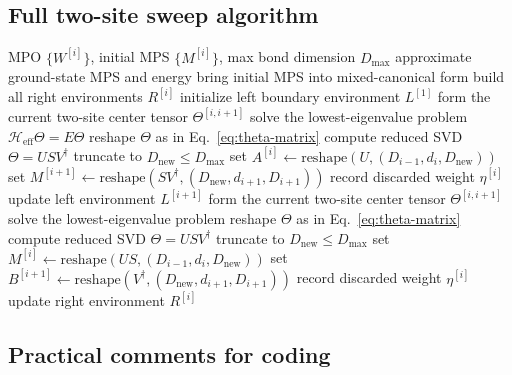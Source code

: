 \documentclass[aps,prb,onecolumn,nofootinbib]{revtex4-2}
\begin{document}
	\subsection{Full two-site sweep algorithm}
	
	\begin{algorithm}[H]
		\caption{TwoSiteDMRG}
		\begin{algorithmic}[1]
			\Require MPO $\{W^{[i]}\}$, initial MPS $\{M^{[i]}\}$, max bond dimension $D_{\max}$
			\Ensure approximate ground-state MPS and energy
			\State bring initial MPS into mixed-canonical form
			\State build all right environments $R^{[i]}$
			\State initialize left boundary environment $L^{[1]}$
			\Repeat
			\State form the current two-site center tensor $\Theta^{[i,i+1]}$
			\State solve the lowest-eigenvalue problem $\mathcal{H}_{\mathrm{eff}}\Theta = E\Theta$
			\State reshape $\Theta$ as in Eq.~\eqref{eq:theta-matrix}
			\State compute reduced SVD $\Theta = U S V^\dagger$
			\State truncate to $D_{\mathrm{new}}\le D_{\max}$
			\State set $A^{[i]} \gets \mathrm{reshape}(U,(D_{i-1},d_i,D_{\mathrm{new}}))$
			\State set $M^{[i+1]} \gets \mathrm{reshape}(S V^\dagger,(D_{\mathrm{new}},d_{i+1},D_{i+1}))$
			\State record discarded weight $\eta^{[i]}$
			\State update left environment $L^{[i+1]}$
			\EndFor
			\State form the current two-site center tensor $\Theta^{[i,i+1]}$
			\State solve the lowest-eigenvalue problem
			\State reshape $\Theta$ as in Eq.~\eqref{eq:theta-matrix}
			\State compute reduced SVD $\Theta = U S V^\dagger$
			\State truncate to $D_{\mathrm{new}}\le D_{\max}$
			\State set $M^{[i]} \gets \mathrm{reshape}(US,(D_{i-1},d_i,D_{\mathrm{new}}))$
			\State set $B^{[i+1]} \gets \mathrm{reshape}(V^\dagger,(D_{\mathrm{new}},d_{i+1},D_{i+1}))$
			\State record discarded weight $\eta^{[i]}$
			\State update right environment $R^{[i]}$
			\EndFor
		\end{algorithmic}
	\end{algorithm}
	
	\subsection{Practical comments for coding}
	
\end{document}
